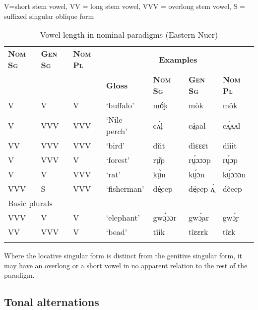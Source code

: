 \documentclass[output=paper,newtxmath,modfonts,nonflat,draftmode]{langsci/langscibook}
\begin{document}
\begin{table}
V=short stem vowel, VV = long stem vowel, VVV = overlong stem vowel, S = suffixed singular oblique form
\begin{tabularx}{\textwidth}{lllXlll}
\lsptoprule

\bfseries\scshape Nom Sg & \bfseries\scshape Gen Sg & \bfseries\scshape Nom Pl & \multicolumn{4}{c}{\bfseries Examples}\\
\cmidrule{4-7}
&  &  & \bfseries Gloss & \bfseries\scshape Nom Sg & \bfseries\scshape Gen Sg & \bfseries\scshape Nom Pl\\
\midrule
V & V & V & ‘buffalo’ & mó̤k & mòk & môk\\
V & VVV & VVV & ‘Nile perch’ & cʌ̤́l  & cá̤aal & cʌ̤́ʌʌl\\
VV & VVV & VVV & ‘bird’ & dîit & dìɛɛɛt & dîiit\\
V & VVV & V & ‘forest’ & rṳ̌p & rṳ́ɔɔɔp & rṳ́ɔp\\
V & V & VVV & ‘rat’ & kṳ̀n & kṳ́ɔn & kṳ́ɔɔɔn\\
VVV & S & VVV & ‘fisherman’ & dé̤eep & dé̤eep-ʌ̤̀ & dêeep\\
\midrule
\multicolumn{7}{l}{Basic plurals}\\
\midrule
VVV & V & V & ‘elephant’ & gwɔ̤́ɔɔr & gwɔ̤́ar & gwɔ̤́r\\
VV & VVV & V & ‘bead’ & tîik & tîɛɛɛk & tîɛk\\
\lspbottomrule
\end{tabularx}
\caption{Vowel length in nominal paradigms (Eastern Nuer)}
\label{tab:monich:20}
\end{table}
Where the locative singular form is distinct from the genitive singular form, it may have an overlong or a short vowel in no apparent relation to the rest of the paradigm.

\subsection{Tonal alternations}
\end{document}
